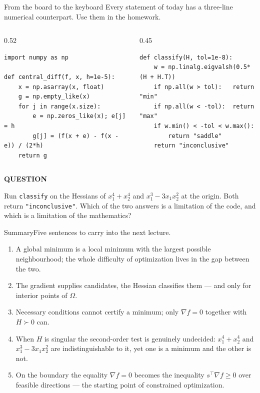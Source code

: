 \documentclass[aspectratio=169,11pt]{beamer}
\newcommand{\kicker}[1]{{\color{hseaccent}\scriptsize\bfseries\MakeUppercase{#1}}}
\newcommand{\takeaway}[2]{%
  \par\smallskip\noindent
  \colorbox{hselight}{\parbox{\dimexpr\textwidth-2\fboxsep}{%
    \kicker{#1}\par\vspace{0.12em}\footnotesize #2}}\par}
\begin{document}
\begin{frame}[fragile]{From the board to the keyboard}
  {Every statement of today has a three-line numerical counterpart. Use them in the homework.}
  \vspace{0.3em}
  \begin{columns}[T,onlytextwidth]
    \begin{column}{0.52\textwidth}
      \begin{lstlisting}
import numpy as np

def central_diff(f, x, h=1e-5):
    x = np.asarray(x, float)
    g = np.empty_like(x)
    for j in range(x.size):
        e = np.zeros_like(x); e[j] = h
        g[j] = (f(x + e) - f(x - e)) / (2*h)
    return g
\end{lstlisting}
    \end{column}
    \begin{column}{0.45\textwidth}
      \begin{lstlisting}
def classify(H, tol=1e-8):
    w = np.linalg.eigvalsh(0.5*(H + H.T))
    if np.all(w > tol):   return "min"
    if np.all(w < -tol):  return "max"
    if w.min() < -tol < w.max():
        return "saddle"
    return "inconclusive"
\end{lstlisting}
    \end{column}
  \end{columns}
  \vspace{0.4em}
  \takeaway{question}{Run \texttt{classify} on the Hessians of $x_1^4+x_2^4$ and $x_1^3-3x_1x_2^2$ at the origin.
    Both return \texttt{"inconclusive"}. Which of the two answers is a limitation of the code, and which is a
    limitation of the mathematics?}
\end{frame}

\begin{frame}{Summary}{Five sentences to carry into the next lecture.}
  \vspace{0.5em}
  \begin{enumerate}\small\setlength{\itemsep}{0.4em}
    \item A global minimum is a local minimum with the largest possible neighbourhood; the whole difficulty of
          optimization lives in the gap between the two.
    \item The gradient supplies candidates, the Hessian classifies them --- and only for interior points of $\Omega$.
    \item Necessary conditions cannot certify a minimum; only $\nabla f=0$ together with $H\succ 0$ can.
    \item When $H$ is singular the second-order test is genuinely undecided: $x_1^4+x_2^4$ and $x_1^3-3x_1x_2^2$
          are indistinguishable to it, yet one is a minimum and the other is not.
    \item On the boundary the equality $\nabla f=0$ becomes the inequality $s^{\top}\nabla f\ge 0$ over feasible
          directions --- the starting point of constrained optimization.
  \end{enumerate}
\end{frame}
\end{document}
